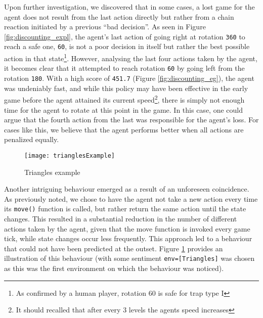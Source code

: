 Upon further investigation, we discovered that in some cases, a lost game for the agent does not result from the last action directly but rather from a chain reaction initiated by a previous ``bad decision''. As seen in Figure \ref{fig:discounting_expl}, the agent's last action of going right at rotation \texttt{360} to reach a safe one, \texttt{60}, is not a poor decision in itself but rather the best possible action in that state\footnote{As confirmed by a human player, rotation 60 is safe for trap type I}. However, analysing the last four actions taken by the agent, it becomes clear that it attempted to reach rotation \texttt{60} by going left from the rotation \texttt{180}. With a high score of \texttt{451.7} (Figure \ref{fig:discounting_eg}), the agent was undeniably fast, and while this policy may have been effective in the early game before the agent attained its current speed\footnote{It should recalled that after every 3 levels the agents speed increases}, there is simply not enough time for the agent to rotate at this point in the game. In this case, one could argue that the fourth action from the last was responsible for the agent's loss. For cases like this, we believe that the agent performs better when all actions are penalized equally.


\label{intbeh}
\begin{figure}[h]
    \centering
    \texttt{[image: trianglesExample]}
    \caption{Triangles example}
    \label{fig:triangles_eg}
\end{figure}

Another intriguing behaviour emerged as a result of an unforeseen coincidence. As previously noted, we chose to have the agent not take a new action every time its \texttt{move()} function is called, but rather return the same action until the state changes. This resulted in a substantial reduction in the number of different actions taken by the agent, given that the move function is invoked every game tick, while state changes occur less frequently. This approach led to a behaviour that could not have been predicted at the outset. Figure \ref{fig:triangles_eg} provides an illustration of this behaviour (with some sentiment \texttt{env=[Triangles]} was chosen as this was the first environment on which the behaviour was noticed).

